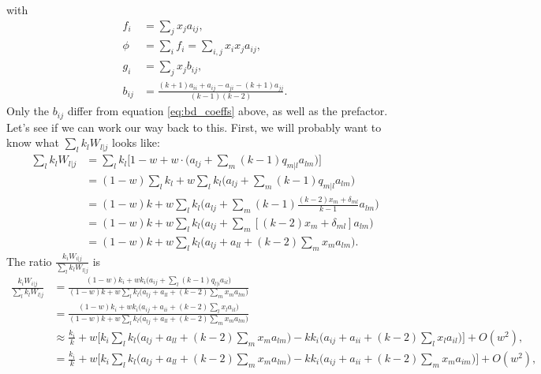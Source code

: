 \documentclass[14pt, a4paper, justified]{article}
\begin{document}
with
\begin{equation}
    \begin{split}
        f_i & = \sum_j x_j a_{ij},
        \\
        \phi & = \sum_i f_i = \sum_{i,j} x_i x_j a_{ij},
        \\
        g_i & = \sum_j x_j b_{ij},
        \\
        b_{ij} & = \frac{(k+1)a_{ii} + a_{ij} - a_{ji} - (k+1)a_{jj}}{(k-1)(k-2)}.
    \end{split}
    \label{eq:db_coeffs}
\end{equation}
Only the $b_{ij}$ differ from equation \ref{eq:bd_coeffs} above, as well as the prefactor.
Let's see if we can work our way back to this.
First, we will probably want to know what $\sum_l k_l W_{l|j}$ looks like:
\begin{equation}
    \begin{split}
        \sum_l k_l W_{l|j} & = \sum_l k_l \Big[ 1 - w + w \cdot \Big( a_{lj} + \sum_m (k-1) q_{m|l} a_{lm} \Big) \Big]
        \\
        & = (1 - w)\sum_l k_l + w \sum_l k_l \Big( a_{lj} + \sum_m (k-1) q_{m|l} a_{lm} \Big)
        \\
        & = (1 - w)k + w \sum_l k_l \Big( a_{lj} + \sum_m (k-1) \frac{(k-2) x_m + \delta_{ml}}{k-1} a_{lm} \Big)
        \\
        & = (1 - w)k + w \sum_l k_l \Big( a_{lj} + \sum_m [(k-2) x_m + \delta_{ml}] a_{lm} \Big)
        \\
        & = (1 - w)k + w \sum_l k_l \Big( a_{lj} + a_{ll} + (k-2) \sum_m x_m a_{lm}  \Big).
    \end{split}
\end{equation}
The ratio $\frac{k_i W_{i|j}}{\sum_l k_l W_{l|j}}$ is
\begin{equation}
    \begin{split}
        \frac{k_i W_{i|j}}{\sum_l k_l W_{l|j}} & = \frac{(1 - w)k_i + w k_i \Big( a_{ij} + \sum_l (k-1) q_{l|i} a_{il} \Big) }{(1 - w)k + w \sum_l k_l \Big( a_{lj} + a_{ll} + (k-2) \sum_m x_m a_{lm} \Big) }
        \\
        & = \frac{(1 - w)k_i + w k_i \Big( a_{ij} + a_{ii} + (k-2) \sum_l x_l a_{il} \Big) }{(1 - w)k + w \sum_l k_l \Big( a_{lj} + a_{ll} + (k-2) \sum_m x_m a_{lm} \Big) }
        \\
        & \approx \frac{k_i}{k} + w \Big[ k_i \sum_l k_l \Big( a_{lj} + a_{ll} + (k-2) \sum_m x_m a_{lm} \Big) - kk_i \Big( a_{ij} + a_{ii} + (k-2) \sum_l x_l a_{il} \Big) \Big] + O(w^2),
        \\
        & = \frac{k_i}{k} + w \Big[ k_i \sum_l k_l \Big( a_{lj} + a_{ll} + (k-2) \sum_m x_m a_{lm} \Big) - kk_i \Big( a_{ij} + a_{ii} + (k-2) \sum_m x_m a_{im} \Big) \Big] + O(w^2),
    \end{split}
\end{equation}
\end{document}
